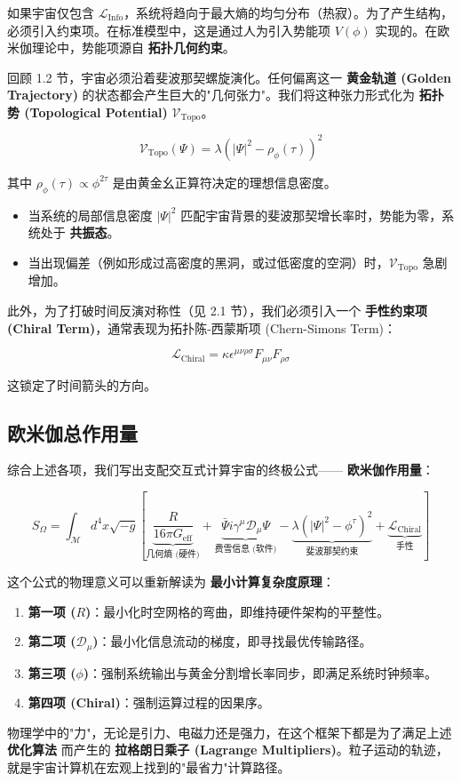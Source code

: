 如果宇宙仅包含 $\mathcal{L}_{\text{Info}}$，系统将趋向于最大熵的均匀分布（热寂）。为了产生结构，必须引入约束项。在标准模型中，这是通过人为引入势能项 $V(\phi)$ 实现的。在欧米伽理论中，势能项源自 \textbf{拓扑几何约束}。

回顾 1.2 节，宇宙必须沿着斐波那契螺旋演化。任何偏离这一 \textbf{黄金轨道 (Golden Trajectory)} 的状态都会产生巨大的"几何张力"。我们将这种张力形式化为 \textbf{拓扑势 (Topological Potential)} $\mathcal{V}_{\text{Topo}}$。

\[\mathcal{V}_{\text{Topo}}(\Psi) = \lambda \left( |\Psi|^2 - \rho_{\phi}(\tau) \right)^2\]

其中 $\rho_{\phi}(\tau) \propto \phi^{2\tau}$ 是由黄金幺正算符决定的理想信息密度。

\begin{itemize}
\item 当系统的局部信息密度 $|\Psi|^2$ 匹配宇宙背景的斐波那契增长率时，势能为零，系统处于 \textbf{共振态}。
\item 当出现偏差（例如形成过高密度的黑洞，或过低密度的空洞）时，$\mathcal{V}_{\text{Topo}}$ 急剧增加。
\end{itemize}

此外，为了打破时间反演对称性（见 2.1 节），我们必须引入一个 \textbf{手性约束项 (Chiral Term)}，通常表现为拓扑陈-西蒙斯项 (Chern-Simons Term)：

\[\mathcal{L}_{\text{Chiral}} = \kappa \epsilon^{\mu\nu\rho\sigma} F_{\mu\nu} F_{\rho\sigma}\]

这锁定了时间箭头的方向。

\subsection{欧米伽总作用量}

综合上述各项，我们写出支配交互式计算宇宙的终极公式—— \textbf{欧米伽作用量}：

\[S_{\Omega} = \int_{\mathcal{M}} d^4x \sqrt{-g} \left[ \underbrace{\frac{R}{16\pi G_{\text{eff}}}}_{\text{几何熵 (硬件)}} + \underbrace{\bar{\Psi} i \gamma^\mu \mathcal{D}_\mu \Psi}_{\text{费雪信息 (软件)}} - \underbrace{\lambda (|\Psi|^2 - \phi^{\tau})^2}_{\text{斐波那契约束}} + \underbrace{\mathcal{L}_{\text{Chiral}}}_{\text{手性}} \right]\]

这个公式的物理意义可以重新解读为 \textbf{最小计算复杂度原理}：

\begin{enumerate}
\item \textbf{第一项 ($R$)}：最小化时空网格的弯曲，即维持硬件架构的平整性。
\item \textbf{第二项 ($\mathcal{D}_\mu$)}：最小化信息流动的梯度，即寻找最优传输路径。
\item \textbf{第三项 ($\phi$)}：强制系统输出与黄金分割增长率同步，即满足系统时钟频率。
\item \textbf{第四项 (Chiral)}：强制运算过程的因果序。
\end{enumerate}

物理学中的"力"，无论是引力、电磁力还是强力，在这个框架下都是为了满足上述 \textbf{优化算法} 而产生的 \textbf{拉格朗日乘子 (Lagrange Multipliers)}。粒子运动的轨迹，就是宇宙计算机在宏观上找到的"最省力"计算路径。
